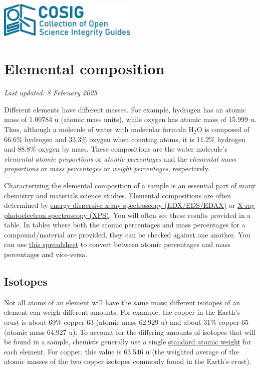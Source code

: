 \documentclass[letterpaper, 12pt]{article}
\begin{document}
\flushleft
\includegraphics[width=0.5\textwidth]{img/home/241017_final_logo_mockup.png}

\section*{Elemental composition}
\textit{Last updated: 8 February 2025}

Different elements have different masses. For example, hydrogen has an atomic mass of 1.00784 u (atomic mass units), while oxygen has atomic mass of 15.999 u. Thus, although a molecule of water with molecular formula H$_2$O is composed of 66.6\% hydrogen and 33.3\% oxygen when counting atoms, it is 11.2\% hydrogen and 88.8\% oxygen by mass. These compositions are the water molecule's \textit{elemental atomic proportions} or \textit{atomic percentages} and the \textit{elemental mass proportions} or \textit{mass percentages} or \textit{weight percentages}, respectively.

Characterizing the elemental composition of a sample is an essential part of many chemistry and materials science studies. Elemental compositions are often determined by \href{https://en.wikipedia.org/wiki/Energy-dispersive_X-ray_spectroscopy}{energy dispersive x-ray spectroscopy (EDX/EDS/EDAX)} or \href{https://en.wikipedia.org/wiki/X-ray_photoelectron_spectroscopy}{X-ray photoelectron spectroscopy (XPS)}. You will often see these results provided in a table. In tables where both the atomic percentages and mass percentages for a compound/material are provided, they can be checked against one another. You can use \href{https://osf.io/gp4mf}{this spreadsheet} to convert between atomic percentages and mass percentages and vice-versa.

\subsection*{Isotopes}

Not all atoms of an element will have the same mass; different isotopes of an element can weigh different amounts. For example, the copper in the Earth's crust is about 69\% copper-63 (atomic mass 62.929 u) and about 31\% copper-65 (atomic mass 64.927 u). To account for the differing amounts of isotopes that will be found in a sample, chemists generally use a single \href{https://en.wikipedia.org/wiki/Standard_atomic_weight}{standard atomic weight} for each element. For copper, this value is 63.546 u (the weighted average of the atomic masses of the two copper isotopes commonly found in the Earth's crust).
\end{document}
